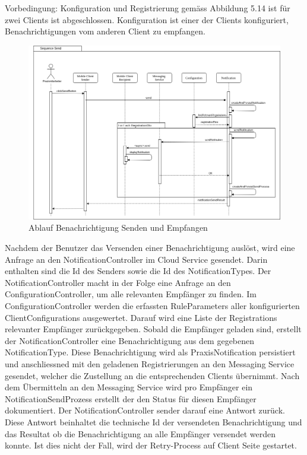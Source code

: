 Vorbedingung:
Konfiguration und Registrierung gemäss Abbildung 5.14 ist für zwei Clients ist abgeschlossen.
Konfiguration ist einer der Clients konfiguriert, Benachrichtigungen vom anderen Client zu empfangen.

\begin{figure}[h]
    \centering
    \begin{minipage}[b]{0.9\textwidth}
        \includegraphics[width=\textwidth]{graphics/Sequence_Notification_Send}
        \caption{Ablauf Benachrichtigung Senden und Empfangen}
    \end{minipage}
\end{figure}

Nachdem der Benutzer das Versenden einer Benachrichtigung auslöst, wird eine Anfrage an den NotificationController im Cloud Service gesendet.
Darin enthalten sind die Id des Senders sowie die Id des NotificationTypes.
Der NotificationController macht in der Folge eine Anfrage an den ConfigurationController, um alle relevanten Empfänger zu finden.
Im ConfigurationController werden die erfassten RuleParameters aller konfigurierten ClientConfigurations ausgewertet.
Darauf wird eine Liste der Registrations relevanter Empfänger zurückgegeben.
Sobald die Empfänger geladen sind, erstellt der NotificationController eine Benachrichtigung aus dem gegebenen NotificationType.
Diese Benachrichtigung wird als PraxisNotification persistiert und anschliessned
mit den geladenen Registrierungen an den Messaging Service gesendet, welcher die Zustellung an die entsprechenden Clients übernimmt.
Nach dem Übermitteln an den Messaging Service wird pro Empfänger ein NotificationSendProzess erstellt der den Status für diesen Empfänger dokumentiert.
Der NotificationController sender darauf eine Antwort zurück.
Diese Antwort beinhaltet die technische Id der versendeten Benachrichtigung und das Resultat ob die Benachrichtigung an alle Empfänger versendet werden konnte.
Ist dies nicht der Fall, wird der Retry-Process auf Client Seite gestartet.

